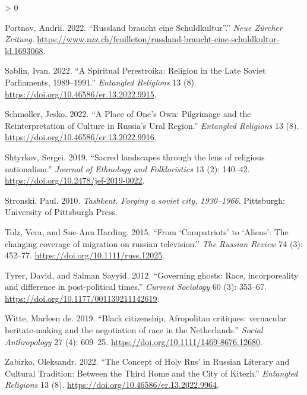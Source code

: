 \documentclass[
  english,
  a4paper,
  DIV=12,
  footlines=2.1,
  usegeometry=true]{scrartcl}
\newlength{\cslhangindent}
\newenvironment{CSLReferences}[2] %
 {%
  \setlength{\parindent}{0pt}
  \ifodd #1 \everypar{\setlength{\hangindent}{\cslhangindent}}\ignorespaces\fi
  \ifnum #2 > 0
  \setlength{\parskip}{#2\baselineskip}
  \fi
 }%
 {}
\begin{document}
\begin{CSLReferences}{1}{0}
\leavevmode{}%
Portnov, Andrii. 2022. {``Russland braucht eine Schuldkultur''.''}
\emph{Neue Zürcher Zeitung}.
\url{https://www.nzz.ch/feuilleton/russland-braucht-eine-schuldkultur-ld.1693068}.

\leavevmode{}%
Sablin, Ivan. 2022. {``A Spiritual Perestroika: Religion in the Late
Soviet Parliaments, 1989--1991.''} \emph{Entangled Religions} 13 (8).
\url{https://doi.org/10.46586/er.13.2022.9915}.

\leavevmode{}%
Schmoller, Jesko. 2022. {``A Place of One's Own: Pilgrimage and the
Reinterpretation of Culture in Russia's Ural Region.''} \emph{Entangled
Religions} 13 (8). \url{https://doi.org/10.46586/er.13.2022.9916}.

\leavevmode{}%
Shtyrkov, Sergei. 2019. {``Sacred landscapes through the lens of
religious nationalism.''} \emph{Journal of Ethnology and Folkloristics}
13 (2): 140--42. \url{https://doi.org/10.2478/jef-2019-0022}.

\leavevmode{}%
Stronski, Paul. 2010. \emph{Tashkent. Forging a soviet city,
1930--1966}. Pittsburgh: University of Pittsburgh Press.

\leavevmode{}%
Tolz, Vera, and Sue-Ann Harding. 2015. {``From {`Compatriots'} to
{`Aliens'}: The changing coverage of migration on russian television.''}
\emph{The Russian Review} 74 (3): 452--77.
\url{https://doi.org/10.1111/russ.12025}.

\leavevmode{}%
Tyrer, David, and Salman Sayyid. 2012. {``Governing ghosts: Race,
incorporeality and difference in post-political times.''} \emph{Current
Sociology} 60 (3): 353--67.
\url{https://doi.org/10.1177/001139211142619}.

\leavevmode{}%
Witte, Marleen de. 2019. {``Black citizenship, Afropolitan critiques:
vernacular heritate-making and the negotiation of race in the
Netherlands.''} \emph{Social Anthropology} 27 (4): 609--25.
\url{https://doi.org/10.1111/1469-8676.12680}.

\leavevmode{}%
Zabirko, Oleksandr. 2022. {``The Concept of Holy Rus' in Russian
Literary and Cultural Tradition: Between the Third Rome and the City of
Kitezh.''} \emph{Entangled Religions} 13 (8).
\url{https://doi.org/10.46586/er.13.2022.9964}.

\end{CSLReferences}
\end{document}
